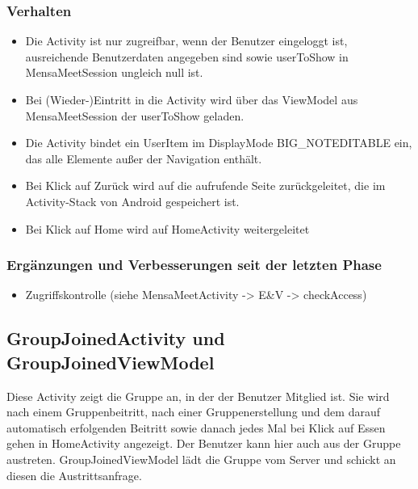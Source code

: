 \documentclass[a4paper]{scrreprt}
\begin{document}
\subsubsection{Verhalten}
\begin{itemize}
\item Die Activity ist nur zugreifbar, wenn der Benutzer eingeloggt ist, ausreichende Benutzerdaten angegeben sind sowie userToShow in MensaMeetSession ungleich null ist.
\item Bei (Wieder-)Eintritt in die Activity wird über das ViewModel aus MensaMeetSession der userToShow geladen. 
\item Die Activity bindet ein UserItem im DisplayMode BIG\_NOTEDITABLE ein, das alle Elemente außer der Navigation enthält.
\item Bei Klick auf Zurück wird auf die aufrufende Seite zurückgeleitet, die im Activity-Stack von Android gespeichert ist. 
\item Bei Klick auf Home wird auf HomeActivity weitergeleitet
\end{itemize}

\subsubsection{Ergänzungen und Verbesserungen seit der letzten Phase}
\begin{itemize}
\item Zugriffskontrolle (siehe MensaMeetActivity -> E\&V -> checkAccess)
\end{itemize}


\subsection{GroupJoinedActivity und GroupJoinedViewModel}
Diese Activity zeigt die Gruppe an, in der der Benutzer Mitglied ist. Sie wird nach einem Gruppenbeitritt, nach einer Gruppenerstellung und dem darauf automatisch erfolgenden Beitritt sowie danach jedes Mal bei Klick auf Essen gehen in HomeActivity angezeigt. Der Benutzer kann hier auch aus der Gruppe austreten. GroupJoinedViewModel lädt die Gruppe vom Server und schickt an diesen die Austrittsanfrage.
\end{document}
